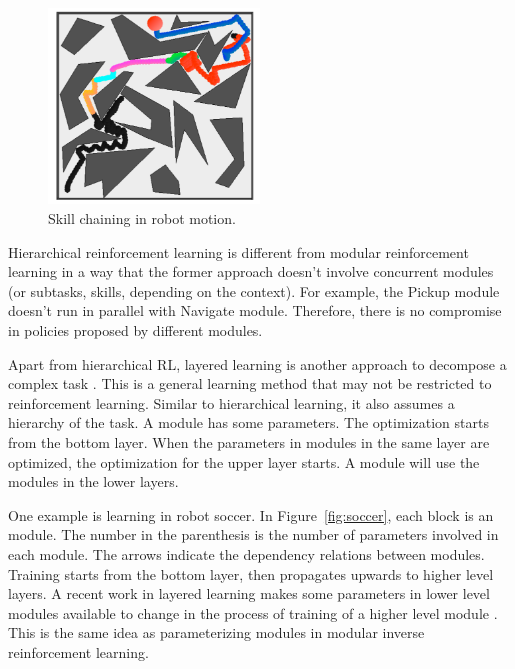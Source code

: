 \begin{figure}[h]
\centering
\includegraphics[width=0.5\textwidth]{skills}
\caption{Skill chaining in robot motion.}
\label{fig:skills}
\end{figure}

Hierarchical reinforcement learning is different from modular reinforcement
learning in a way that the former approach doesn't involve concurrent modules
(or subtasks, skills, depending on the context).
For example, the Pickup module doesn't run in parallel with Navigate module.
Therefore, there is no compromise in policies proposed by different modules.

Apart from hierarchical RL, layered learning is another approach to decompose a
complex task \cite{stone2000layered}. This is a general learning method that may
not be restricted to reinforcement learning. Similar to hierarchical learning, it
also assumes a hierarchy of the task. A module has some parameters. The
optimization starts from the bottom layer. When the parameters in modules in
the same layer are optimized, the optimization for the upper layer starts. A
module will use the modules in the lower layers.

One example is learning in robot soccer. In Figure~\ref{fig:soccer}, each block
is an module. The number in the parenthesis is the number of parameters involved
in each module. The arrows indicate the dependency relations between modules.
Training starts from the bottom layer, then propagates upwards to higher level
layers.
A recent work in layered learning makes some parameters in lower level modules
available to change in the process of training of a higher level module
\cite{macalpine2015ut}. This is the same idea as parameterizing modules in
modular inverse reinforcement learning. 


